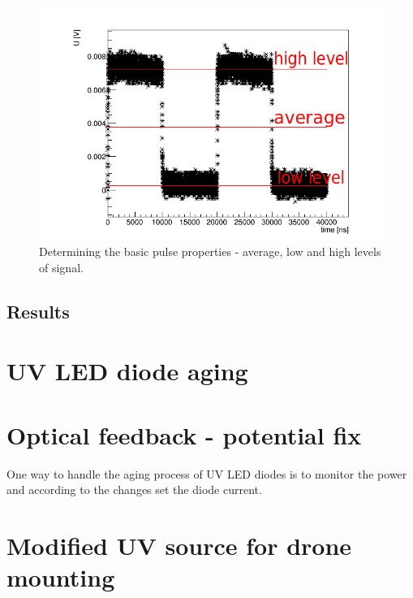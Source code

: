  \begin{figure}[H]
 \centering
 \includegraphics[scale=0.65]{./pictures/PMTPulse}
 \caption{Determining the basic pulse properties - average, low and high levels of signal.}
 \label{pulse}
\end{figure}



\subsection{Results}

\section{UV LED diode aging}

\section{Optical feedback - potential fix}
One way to handle the aging process of UV LED diodes is to monitor the power and according to the changes set the diode current. 



\section{Modified UV source for drone mounting}



